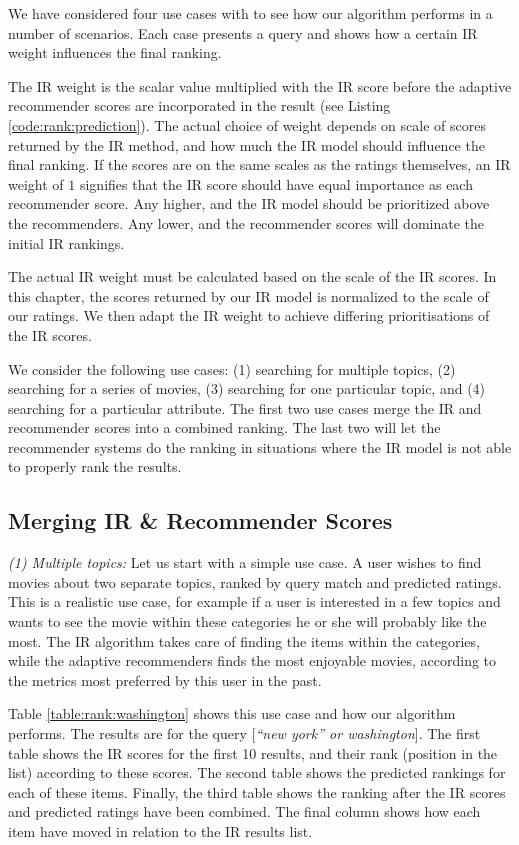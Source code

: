 We have considered four use cases with to see how our algorithm
performs in a number of scenarios. Each case presents 
a query and shows how a certain IR weight influences the final ranking.

The IR weight is the scalar value multiplied with the IR score 
before the adaptive recommender scores are incorporated in the result
(see Listing \ref{code:rank:prediction}).
The actual choice of weight depends on scale of scores
returned by the IR method, and how much the IR model should influence the final ranking.
If the scores are on the same scales as the ratings themselves,
an IR weight of $1$ signifies that the IR score
should have equal importance as each recommender score.
Any higher, and the IR model should be prioritized above the recommenders.
Any lower, and the recommender scores will dominate the initial IR rankings.

The actual IR weight must
be calculated based on the scale of the IR scores.
In this chapter, the scores returned by our IR
model is normalized to the scale of our ratings.
We then adapt the IR weight to achieve differing prioritisations of the IR scores.

We consider the following use cases:
(1) searching for multiple topics,
(2) searching for a series of movies,
(3) searching for one particular topic, and
(4) searching for a particular attribute.
The first two use cases merge the IR and recommender scores
into a combined ranking.
The last two will let the recommender systems do the ranking
in situations where the IR model is not able to properly rank the results.



\afterpage{\clearpage}

\subsection{Merging IR \& Recommender Scores}

\emph{(1) Multiple topics:} Let us start with a simple use case.
A user wishes to find movies about two separate topics, ranked by 
query match and predicted ratings.
This is a realistic use case, for example if a user is interested
in a few topics and wants to see the movie within these categories
he or she will probably like the most.
The IR algorithm takes care of finding the items within the categories,
while the adaptive recommenders finds the most enjoyable movies,
according to the metrics most preferred by this user in the past.

Table \ref{table:rank:washington} shows this use case and how our algorithm performs.
The results are for the query [\emph{``new york'' or washington}].
The first table shows the IR scores for the first 10 results,
and their rank (position in the list) according to these scores.
The second table shows the predicted rankings for each of these items.
Finally, the third table shows the ranking after the IR scores
and predicted ratings have been combined.
The final column shows how each item have moved in relation to the 
IR results list.

